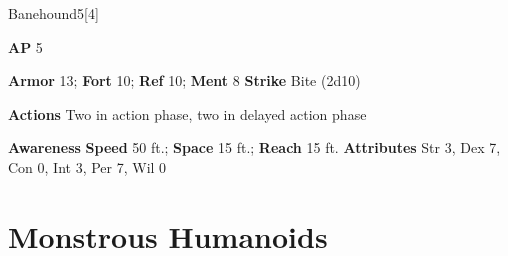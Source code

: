 \begin{monsection}{Banehound}{5}[4]
\vspace{-1em}\vspace{-1em}
\begin{spellcontent}
\begin{spelltargetinginfo}
{\textbf{AP} 5}

\pari \textbf{Armor} 13;
\textbf{Fort} 10;
\textbf{Ref} 10;
\textbf{Ment} 8
\pari \textbf{Strike} Bite  (2d10)


\pari \textbf{Actions} Two in action phase, two in delayed action phase
\end{spelltargetinginfo}


\end{spellcontent}

\begin{monsterfooter}
\pari \textbf{Awareness} 
\pari \textbf{Speed} 50 ft.;
\textbf{Space} 15 ft.;
\textbf{Reach} 15 ft.
\pari \textbf{Attributes}
Str 3,
Dex 7,
Con 0,
Int 3,
Per 7,
Wil 0
\end{monsterfooter}
\end{monsection}


\section{Monstrous Humanoids}

